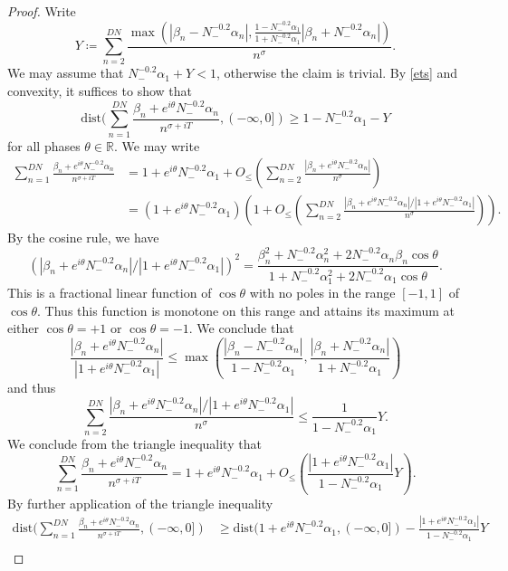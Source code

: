 \documentclass[a4paper,11pt,twoside]{amsart}
\newcommand\R{\mathbb{R}}
\begin{document}
\begin{proof}
Write 
$$ Y \coloneqq \sum_{n=2}^{DN} \frac{\max(|\beta_n-N_-^{-0.2} \alpha_n|, \frac{1-N_-^{-0.2} \alpha_1}{1+N_-^{-0.2} \alpha_1} |\beta_n+N_-^{-0.2} \alpha_n|)}{n^{\sigma}}.$$
We may assume that $N_-^{-0.2} \alpha_1+Y < 1$, otherwise the claim is trivial.  By \eqref{ets} and convexity, it suffices to show that
$$
\mathrm{dist}( \sum_{n=1}^{DN} \frac{\beta_n + e^{i\theta} N_-^{-0.2} \alpha_n}{n^{\sigma+iT}}, (-\infty,0]) \geq 1 - N_-^{-0.2} \alpha_1 - Y$$
for all phases $\theta \in \R$.  We may write
\begin{align*}
\sum_{n=1}^{DN} \frac{\beta_n + e^{i\theta} N_-^{-0.2} \alpha_n}{n^{\sigma+iT}} &= 1 + e^{i\theta} N_-^{-0.2} \alpha_1 + O_{\leq}\left( \sum_{n=2}^{DN}
\frac{|\beta_n + e^{i\theta} N_-^{-0.2} \alpha_n|}{n^{\sigma}} \right) \\
&=
(1 + e^{i\theta} N_-^{-0.2} \alpha_1) \left(1 + O_{\leq}\left( \sum_{n=2}^{DN}
\frac{|\beta_n + e^{i\theta} N_-^{-0.2} \alpha_n|/|1+e^{i\theta} N_-^{-0.2} \alpha_1|}{n^{\sigma}} \right) \right).
\end{align*}
By the cosine rule, we have
$$ \left(|\beta_n + e^{i\theta} N_-^{-0.2} \alpha_n| / |1 + e^{i\theta} N_-^{-0.2} \alpha_1|\right)^2 = \frac{\beta_n^2 + N_-^{-0.2} \alpha_n^2 + 2 N_-^{-0.2} \alpha_n \beta_n \cos \theta}{1 + N_-^{-0.2} \alpha_1^2 + 2 N_-^{-0.2} \alpha_1 \cos \theta}.$$
This is a fractional linear function of $\cos \theta$ with no poles in the range $[-1,1]$ of $\cos \theta$.  Thus this function is monotone on this range and attains its maximum at either $\cos \theta=+1$ or $\cos \theta = -1$.  We conclude that
$$ \frac{|\beta_n + e^{i\theta} N_-^{-0.2} \alpha_n|}{|1 + e^{i\theta} N_-^{-0.2} \alpha_1|} \leq \max\left( \frac{|\beta_n-N_-^{-0.2} \alpha_n|}{1-N_-^{-0.2} \alpha_1}, \frac{|\beta_n+N_-^{-0.2} \alpha_n|}{1+N_-^{-0.2} \alpha_1} \right)$$
and thus
$$ \sum_{n=2}^{DN} \frac{|\beta_n + e^{i\theta} N_-^{-0.2} \alpha_n|/|1+e^{i\theta} N_-^{-0.2} \alpha_1|}{n^{\sigma}} \leq \frac{1}{1-N_-^{-0.2} \alpha_1} Y.$$
We conclude from the triangle inequality that
$$ \sum_{n=1}^{DN} \frac{\beta_n + e^{i\theta} N_-^{-0.2} \alpha_n}{n^{\sigma+iT}} = 1 + e^{i\theta} N_-^{-0.2} \alpha_1 + O_{\leq}\left( \frac{|1+e^{i\theta} N_-^{-0.2} \alpha_1|}{1-N_-^{-0.2} \alpha_1} Y \right).$$
By further application of the triangle inequality
\begin{align*}
\mathrm{dist}( \sum_{n=1}^{DN} \frac{\beta_n + e^{i\theta} N_-^{-0.2} \alpha_n}{n^{\sigma+iT}}, (-\infty,0]) &\geq \mathrm{dist}( 1 + e^{i\theta} N_-^{-0.2} \alpha_1, (-\infty,0]) - \frac{|1+e^{i\theta} N_-^{-0.2} \alpha_1|}{1-N_-^{-0.2} \alpha_1} Y \\

\end{align*}
\end{proof}
\end{document}
